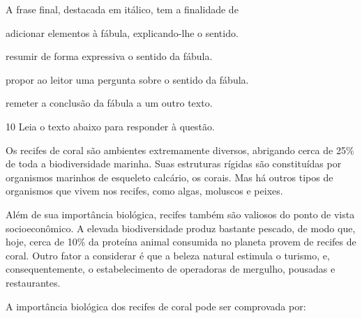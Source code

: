 
A frase final, destacada em itálico, tem a finalidade de 

\begin{escolha}
    
    \item adicionar elementos à fábula, explicando-lhe o sentido. 
    
    \item resumir de forma expressiva o sentido da fábula. 
    
    \item propor ao leitor uma pergunta sobre o sentido da fábula.
    
    \item remeter a conclusão da fábula a um outro texto.  

\end{escolha}

\num{10} Leia o texto abaixo para responder à questão. 

\begin{myquote}

Os recifes de coral são ambientes extremamente diversos, abrigando cerca
de 25\% de toda a biodiversidade marinha. Suas estruturas rígidas são
constituídas por organismos marinhos de esqueleto calcário, os corais.
Mas há outros tipos de organismos que vivem nos recifes, como algas,
moluscos e peixes.

Além de sua importância biológica, recifes também são valiosos do ponto
de vista socioeconômico. A elevada biodiversidade produz bastante
pescado, de modo que, hoje, cerca de 10\% da proteína animal consumida
no planeta provem de recifes de coral. Outro fator a considerar é que a
beleza natural estimula o turismo, e, consequentemente, o
estabelecimento de operadoras de mergulho, pousadas e restaurantes.

\end{myquote}


A importância biológica dos recifes de coral pode ser comprovada por:

